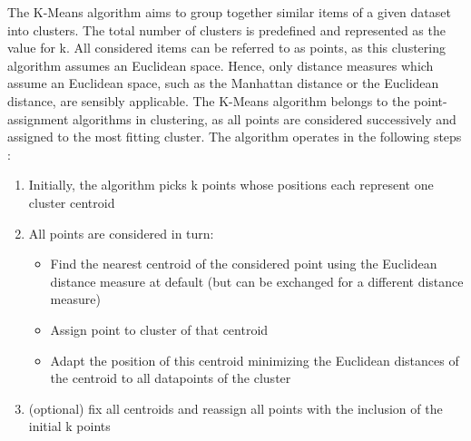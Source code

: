 The K-Means algorithm aims to group together similar items of a given dataset into clusters. 
The total number of clusters is predefined and represented as the value for k. All considered items can be referred to as points, as this clustering algorithm assumes an Euclidean space. Hence, only distance measures which assume an Euclidean space, such as the Manhattan distance or the Euclidean distance, are sensibly applicable. The K-Means algorithm belongs to the point-assignment algorithms in clustering, as all points are considered successively and assigned to the most fitting cluster. The algorithm operates in the following steps \cite{MMDS}:
\begin{enumerate}
	\item Initially, the algorithm picks k points whose positions each represent one cluster centroid
	\item All points are considered in turn:
	\begin{itemize}
		\item Find the nearest centroid of the considered point  using the Euclidean distance measure at default (but can be exchanged for a different distance measure)
		\item Assign point to cluster of that centroid
		\item Adapt the position of this centroid minimizing the Euclidean distances of the centroid to all datapoints of the cluster
	\end{itemize}	
	
	\item (optional) fix all centroids and reassign all points with the inclusion of the initial k points
	
\end{enumerate}

